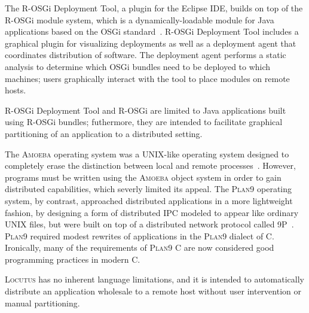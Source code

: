 \documentclass[11pt]{article}
\newcommand{\ninep}{\textsc{9P}\xspace}
\newcommand{\amoeba}{\textsc{Amoeba}\xspace}
\newcommand{\locutus}{\textsc{Locutus}\xspace}
\newcommand{\plannine}{\textsc{Plan9}\xspace}
\newcommand{\rosgig}{R-OSGi Deployment Tool\xspace}
\newcommand{\rosgi}{R-OSGi\xspace}
\begin{document}
The \rosgig, a plugin for the Eclipse IDE, builds on top of the \rosgi module system, which is a dynamically-loadable module for Java applications based on the OSGi standard~\cite{10.5555/1785080.1785082, 10.1145/1328279.1328290}.   \rosgig includes a graphical plugin for visualizing deployments as well as a deployment agent that coordinates distribution of software.  The deployment agent performs a static analysis to determine which OSGi bundles need to be deployed to which machines; users graphically interact with the tool to place modules on remote hosts.

\rosgig and \rosgi are limited to Java applications built using \rosgi bundles; futhermore, they are intended to facilitate graphical partitioning of an application to a distributed setting.

The \amoeba operating system was a UNIX-like operating system designed to completely erase the distinction between local and remote processes~\cite{10.1109/2.53354}.  However, programs must be written using the \amoeba object system in order to gain distributed capabilities, which severly limited its appeal.  The \plannine operating system, by contrast, approached distributed applications in a more lightweight fashion, by designing a form of distributed IPC modeled to appear like ordinary UNIX files, but were built on top of a distributed network protocol called \ninep~\cite{DBLP:journals/csys/PikePDFTT95}.  \plannine required modest rewrites of applications in the \plannine dialect of C.  Ironically, many of the requirements of \plannine C are now considered good programming practices in modern C.

\locutus has no inherent language limitations, and it is intended to automatically distribute an application wholesale to a remote host without user intervention or manual partitioning.



\end{document}
